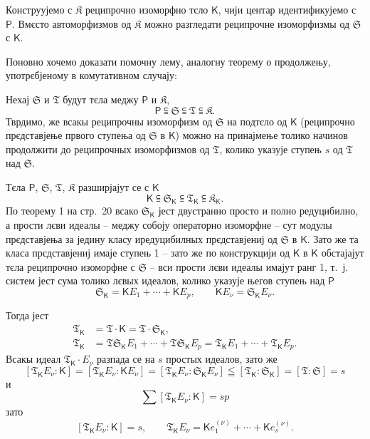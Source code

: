 \documentclass[11pt]{article}
\begin{document}
Конструујемо с \(\mathfrak K\) реципрочно изоморфно тєло \(\mathsf{K}\), чији центар идентификујемо с \(\mathsf P\). Вмєсто автоморфизмов од \(\mathfrak K\) можно разгледати реципрочне изоморфизмы од \(\mathfrak S\) с \(\mathsf{K}\).

Поновно хочемо доказати помочну лему, аналогну теорему о продолжењу, употрєбјеному в комутативном случају:

Нехај \(\mathfrak S\) и \(\mathfrak T\) будут тєла меджу \(\mathsf P\) и \(\mathfrak K\),
\[
\mathsf P \subseteqq \mathfrak S \subseteqq \mathfrak T \subseteqq \mathfrak K.
\]
Тврдимо, же всакы реципрочны изоморфизм од \(\mathfrak S\) на подтєло од \(\mathsf{K}\) (реципрочно прєдставјење првого ступења од \(\mathfrak S\) в \(\mathsf{K}\)) можно на принајмење толико начинов продолжити до реципрочных изоморфизмов од \(\mathfrak T\), колико указује ступењ \(s\) од \(\mathfrak T\) над \(\mathfrak S\).

Тєла \(\mathsf P\), \(\mathfrak S\), \(\mathfrak T\), \(\mathfrak K\) разширјајут се с \(\mathsf{K}\)
\[
\mathsf{K}\subseteqq \mathfrak S_{\mathsf{K}}\subseteqq \mathfrak T_{\mathsf{K}}\subseteqq \mathfrak K_{\mathsf{K}}.
\]
По теорему 1 на стр.~20 всако \(\mathfrak S_{\mathsf{K}}\) јест двустранно просто и полно редуцибилно, а прости лєви идеалы -- меджу собоју операторно изоморфне -- сут модулы прєдставјења за једину класу иредуцибилных прєдставјениј од \(\mathfrak S\) в \(\mathsf{K}\). Зато же та класа прєдставјениј имаје ступењ 1 -- зато же по конструкцији од \(\mathsf{K}\) в \(\mathsf{K}\) обстајајут тєла реципрочно изоморфне с \(\mathfrak S\) -- вси прости лєви идеалы имајут ранг 1, т.~ј. систем јест сума толико лєвых идеалов, колико указује његов ступењ над \(\mathsf P\)
\[
\mathfrak S_{\mathsf{K}}=\mathsf K E_1+\cdots+\mathsf K E_p,\qquad \mathsf K E_\nu=\mathfrak S_{\mathsf{K}} E_\nu.
\]

Тогда јест
\[
\begin{aligned}
\mathfrak T_{\mathsf{K}}&=\mathfrak T\cdot \mathsf{K}=\mathfrak T\cdot \mathfrak S_{\mathsf{K}},\\
\mathfrak T_{\mathsf{K}}&=\mathfrak T\mathfrak S_{\mathsf{K}} E_1+\cdots+\mathfrak T\mathfrak S_{\mathsf{K}} E_p
              =\mathfrak T_{\mathsf{K}} E_1+\cdots+\mathfrak T_{\mathsf{K}} E_p.
\end{aligned}
\]
Всакы идеал \(\mathfrak T_{\mathsf{K}}\cdot E_\nu\) разпада се на \(s\) простых идеалов, зато же
\[
[\mathfrak T_{\mathsf{K}} E_\nu:\mathsf{K}]=[\mathfrak T_{\mathsf{K}} E_\nu:\mathsf K E_\nu]=[\mathfrak T_{\mathsf{K}} E_\nu:\mathfrak S_{\mathsf{K}} E_\nu]\leqq[\mathfrak T_{\mathsf{K}}:\mathfrak S_{\mathsf{K}}]=[\mathfrak T:\mathfrak S]=s
\]
и
\[
\sum [\mathfrak T_{\mathsf{K}} E_\nu:\mathsf{K}]=sp
\]
зато
\[
[\mathfrak T_{\mathsf{K}} E_\nu:\mathsf{K}]=s,
\qquad
\mathfrak T_{\mathsf{K}} E_\nu=\mathsf K e_1^{(\nu)}+\cdots+\mathsf K e_s^{(\nu)}.
\]
\end{document}
